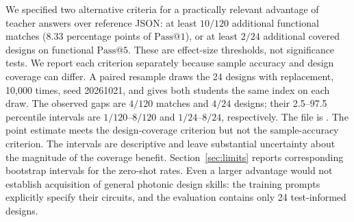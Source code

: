 \documentclass[11pt]{article}
\makeatletter
\newcommand{\passk}[1]{\mathrm{Pass@}#1}
\makeatother
\begin{document}
We specified two alternative criteria for a practically relevant advantage of teacher answers over reference JSON: at least $10/120$ additional functional matches ($8.33$ percentage points of $\passk{1}$), or at least $2/24$ additional covered designs on functional $\passk{5}$. These are effect-size thresholds, not significance tests. We report each criterion separately because sample accuracy and design coverage can differ.
A paired resample draws the 24 designs with replacement, 10{,}000 times, seed 20261021, and gives both students the same index on each draw.
The observed gaps are $4/120$ matches and $4/24$ designs; their 2.5--97.5 percentile intervals are $1/120$--$8/120$ and $1/24$--$8/24$, respectively.
The file is .
The point estimate meets the design-coverage criterion but not the sample-accuracy criterion. The intervals are descriptive and leave substantial uncertainty about the magnitude of the coverage benefit. Section~\ref{sec:limits} reports corresponding bootstrap intervals for the zero-shot rates. Even a larger advantage would not establish acquisition of general photonic design skills: the training prompts explicitly specify their circuits, and the evaluation contains only 24 test-informed designs.
\end{document}

